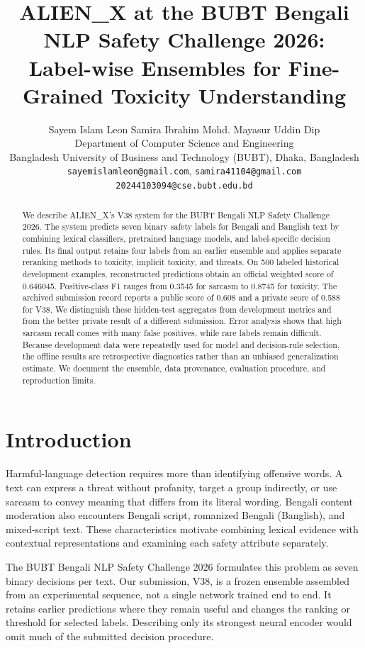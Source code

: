 \documentclass[10pt,a4paper]{article}
\title{ALIEN\_X at the BUBT Bengali NLP Safety Challenge 2026:\\Label-wise Ensembles for Fine-Grained Toxicity Understanding}
\author{Sayem Islam Leon \quad Samira Ibrahim \quad Mohd. Mayasur Uddin Dip\\
Department of Computer Science and Engineering\\
Bangladesh University of Business and Technology (BUBT), Dhaka, Bangladesh\\
\small\texttt{sayemislamleon@gmail.com}, \texttt{samira41104@gmail.com}\\
\small\texttt{20244103094@cse.bubt.edu.bd}}
\begin{document}
\normalsize
\maketitle\thispagestyle{bubtfirstpage}
\begin{abstract}
We describe ALIEN\_X's V38 system for the BUBT Bengali NLP Safety Challenge 2026. The system predicts seven binary safety labels for Bengali and Banglish text by combining lexical classifiers, pretrained language models, and label-specific decision rules. Its final output retains four labels from an earlier ensemble and applies separate reranking methods to toxicity, implicit toxicity, and threats. On 500 labeled historical development examples, reconstructed predictions obtain an official weighted score of 0.646045. Positive-class F1 ranges from 0.3545 for sarcasm to 0.8745 for toxicity. The archived submission record reports a public score of 0.608 and a private score of 0.588 for V38. We distinguish these hidden-test aggregates from development metrics and from the better private result of a different submission. Error analysis shows that high sarcasm recall comes with many false positives, while rare labels remain difficult. Because development data were repeatedly used for model and decision-rule selection, the offline results are retrospective diagnostics rather than an unbiased generalization estimate. We document the ensemble, data provenance, evaluation procedure, and reproduction limits.
\end{abstract}

\section{Introduction}
Harmful-language detection requires more than identifying offensive words. A text can express a threat without profanity, target a group indirectly, or use sarcasm to convey meaning that differs from its literal wording. Bengali content moderation also encounters Bengali script, romanized Bengali (Banglish), and mixed-script text. These characteristics motivate combining lexical evidence with contextual representations and examining each safety attribute separately.

The BUBT Bengali NLP Safety Challenge 2026 formulates this problem as seven binary decisions per text. Our submission, V38, is a frozen ensemble assembled from an experimental sequence, not a single network trained end to end. It retains earlier predictions where they remain useful and changes the ranking or threshold for selected labels. Describing only its strongest neural encoder would omit much of the submitted decision procedure.
\end{document}
